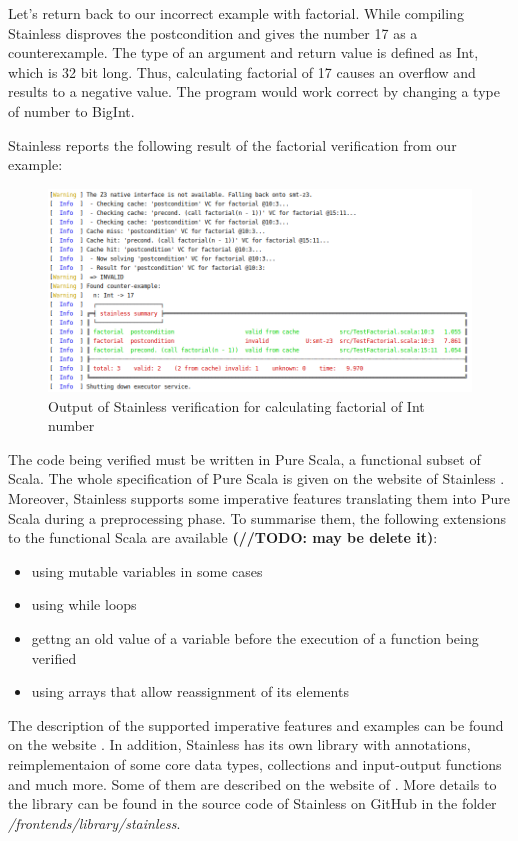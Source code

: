 Let's return back to our incorrect example with factorial. While compiling Stainless disproves the postcondition and gives the number 17 as a counterexample.
The type of an argument and return value is defined as Int, which is 32 bit long.
Thus, calculating factorial of 17 causes an overflow and results to a negative value.
The program would work correct by changing a type of number to BigInt.

Stainless reports the following result of the factorial verification from our example:

\begin{figure}[H]
	\centering
		\includegraphics[scale=0.5]{images/output1.png}
	\caption{Output of Stainless verification for calculating factorial of Int number}
	\label{fig:output1}
\end{figure}


The code being verified must be written in Pure Scala, a functional subset of Scala. 
The whole specification of Pure Scala is given on the website of Stainless \cite{Stainless:pure_scala}.
Moreover, Stainless supports some imperative features translating them into Pure Scala during a preprocessing phase.
To summarise them, the following extensions to the functional Scala are available \textbf{(//TODO: may be delete it)}: 
\begin{itemize}
  \item using mutable variables in some cases
  \item using while loops
  \item gettng an old value of a variable before the execution of a function being verified
  \item using arrays that allow reassignment of its elements
\end{itemize}
The description of the supported imperative features and examples can be found on the website \cite{Stainless:imperative}. 
In addition, Stainless has its own library with annotations, reimplementaion of some core data types, collections and input-output functions and much more.
Some of them are described on the website of \cite{Stainless:library}.
More details to the library can be found in the source code of Stainless on GitHub \cite{Stainless:github} in the folder \textit{/frontends/library/stainless}.

